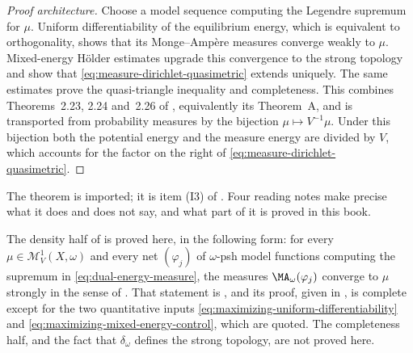 \begin{proof}[Proof architecture]
Choose a model sequence computing the Legendre supremum for $\mu$.
Uniform differentiability of the equilibrium energy, which is equivalent to
orthogonality, shows that its Monge--Amp\`ere measures converge weakly to
$\mu$.  Mixed-energy Hölder estimates upgrade this convergence to the
strong topology and show that \eqref{eq:measure-dirichlet-quasimetric}
extends uniquely.  The same estimates prove the quasi-triangle inequality
and completeness.  This combines Theorems~2.23, 2.24 and~2.26 of
\cite{BJ25FiniteEnergy}, equivalently its Theorem~A, and is transported
from probability measures by the bijection
$\mu\mapsto V^{-1}\mu$.  Under this bijection both the potential energy and
the measure energy are divided by $V$, which accounts for the factor on the
right of \eqref{eq:measure-dirichlet-quasimetric}.
\end{proof}

The theorem is imported; it is item \textup{(I3)} of
.  Four reading notes make precise what it does and
does not say, and what part of it is proved in this book.

\begin{remark}
\label{rem:ch28-what-of-completion-is-proved}
The density half of  is proved
here, in the following form: for every $\mu\in\mathcal M^1_V(X,\omega)$
and every net $(\varphi_j)$ of $\omega$-psh model functions computing
the supremum in \eqref{eq:dual-energy-measure}, the measures
$\MA_\omega(\varphi_j)$ converge to $\mu$ strongly in the sense of
.  That statement is
, and its proof, given in
, is complete except for the two quantitative
inputs \eqref{eq:maximizing-uniform-differentiability} and
\eqref{eq:maximizing-mixed-energy-control}, which are quoted.  The
completeness half, and the fact that $\delta_\omega$ defines the strong
topology, are not proved here.
\end{remark}


